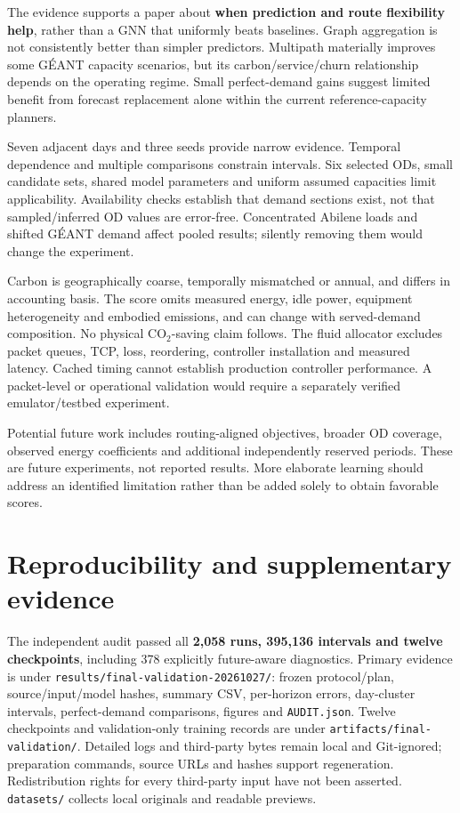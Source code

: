 \documentclass[conference,letterpaper]{IEEEtran}
\begin{document}
The evidence supports a paper about \textbf{when prediction and route flexibility help}, rather than a GNN that uniformly beats baselines. Graph aggregation is not consistently better than simpler predictors. Multipath materially improves some GÉANT capacity scenarios, but its carbon/service/churn relationship depends on the operating regime. Small perfect-demand gains suggest limited benefit from forecast replacement alone within the current reference-capacity planners.

Seven adjacent days and three seeds provide narrow evidence. Temporal dependence and multiple comparisons constrain intervals. Six selected ODs, small candidate sets, shared model parameters and uniform assumed capacities limit applicability. Availability checks establish that demand sections exist, not that sampled/inferred OD values are error-free. Concentrated Abilene loads and shifted GÉANT demand affect pooled results; silently removing them would change the experiment.

Carbon is geographically coarse, temporally mismatched or annual, and differs in accounting basis. The score omits measured energy, idle power, equipment heterogeneity and embodied emissions, and can change with served-demand composition. No physical CO$_2$-saving claim follows. The fluid allocator excludes packet queues, TCP, loss, reordering, controller installation and measured latency. Cached timing cannot establish production controller performance. A packet-level or operational validation would require a separately verified emulator/testbed experiment.

Potential future work includes routing-aligned objectives, broader OD coverage, observed energy coefficients and additional independently reserved periods. These are future experiments, not reported results. More elaborate learning should address an identified limitation rather than be added solely to obtain favorable scores.

\section{Reproducibility and supplementary evidence}

The independent audit passed all \textbf{2,058 runs, 395,136 intervals and twelve checkpoints}, including 378 explicitly future-aware diagnostics. Primary evidence is under \texttt{results/final-validation-20261027/}: frozen protocol/plan, source/input/model hashes, summary CSV, per-horizon errors, day-cluster intervals, perfect-demand comparisons, figures and \texttt{AUDIT.json}. Twelve checkpoints and validation-only training records are under \texttt{artifacts/final-validation/}. Detailed logs and third-party bytes remain local and Git-ignored; preparation commands, source URLs and hashes support regeneration. Redistribution rights for every third-party input have not been asserted. \texttt{datasets/} collects local originals and readable previews.
\end{document}
